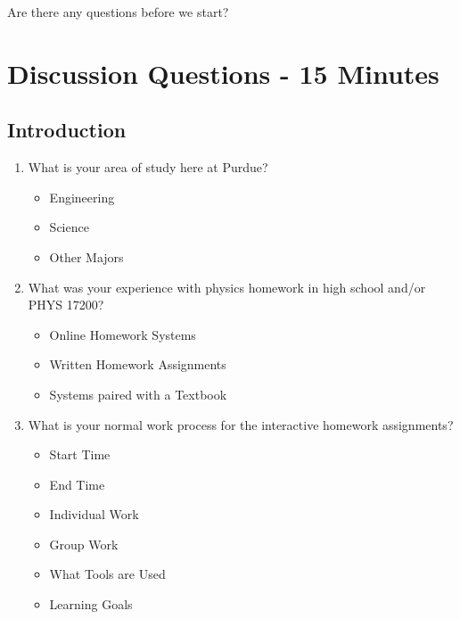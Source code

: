 Are there any questions before we start?

\section{Discussion Questions - 15 Minutes}

\subsection{Introduction}
\begin{enumerate}
	\item What is your area of study here at Purdue?
	\begin{itemize}
		\item Engineering
		\item Science
		\item Other Majors
	\end{itemize}
	\item What was your experience with physics homework in high school and/or PHYS 17200?
	\begin{itemize}
		\item Online Homework Systems
		\item Written Homework Assignments
		\item Systems paired with a Textbook
	\end{itemize}
	\item What is your normal work process for the interactive homework assignments?
	\begin{itemize}
		\item Start Time
		\item End Time
		\item Individual Work
		\item Group Work
		\item What Tools are Used
		\item Learning Goals
	\end{itemize}
\end{enumerate}

